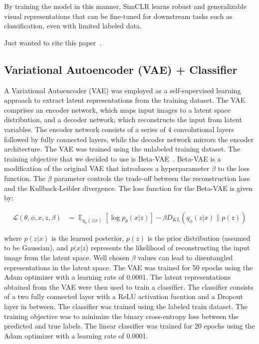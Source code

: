 \documentclass{article}
\DeclareMathOperator{\E}{\mathbb{E}}
\begin{document}
By training the model in this manner, SimCLR learns robust and generalizable
visual representations that can be fine-tuned for downstream tasks such as
classification, even with limited labeled data.

Just wanted to cite this paper~\cite{simclr}.

\subsection{Variational Autoencoder (VAE) + Classifier}

A Variational Autoencoder (VAE) was employed as a self-supervised learning
approach to extract latent representations from the training dataset. The VAE
comprises an encoder network, which maps input images to a latent space
distribution, and a decoder network, which reconstructs the input from latent
variables. The encoder network consists of a series of 4 convolutional layers
followed by fully connected layers, while the decoder network mirrors the
encoder architecture. The VAE was trained using the unlabeled training dataset.
The training objective that we decided to use is Beta-VAE~\cite{beta-vae}.
Beta-VAE is a modification of the original VAE that introduces a hyperparameter
$\beta$ to the loss function. The $\beta$ parameter controls the trade-off
between the reconstruction loss and the Kullback-Leibler divergence. The loss
function for the Beta-VAE is given by:

\begin{align}
  \mathcal{L}(\theta, \phi, x, z, \beta) & = \E_{q_\phi(z|x)}[\log p_\theta(x|z)] - \beta D_{KL}(q_\phi(z|x)\| p(z))
\end{align}

where $p(z|x)$ is the learned posterior, $p(z)$ is the prior distribution
(assumed to be Gaussian), and $p(x|z$) represents the likelihood of
reconstructing the input image from the latent space. Well chosen $\beta$
values can lead to disentangled representations in the latent space. The VAE
was trained for 50 epochs using the Adam optimizer with a learning rate of
0.0001. The latent representations obtained from the VAE were then used to
train a classifier. The classifier consists of a two fully connected layer with
a ReLU activation fucntion and a Dropout layer in between. The classifier was
trained using the labeled train dataset. The training objective was to minimize
the binary cross-entropy loss between the predicted and true labels. The linear
classifier was trained for 20 epochs using the Adam optimizer with a learning
rate of 0.0001.
\end{document}
